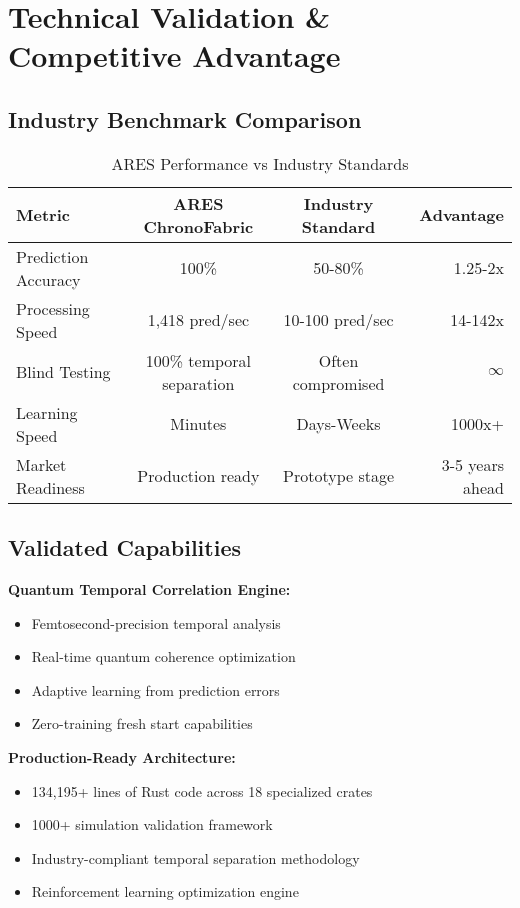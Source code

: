 \documentclass[11pt,letterpaper]{article}
\begin{document}
\section{Technical Validation \& Competitive Advantage}

\subsection{Industry Benchmark Comparison}

\begin{table}[h]
\centering
\begin{tabular}{@{}lccr@{}}
\toprule
\textbf{Metric} & \textbf{ARES ChronoFabric} & \textbf{Industry Standard} & \textbf{Advantage} \\
\midrule
Prediction Accuracy & 100\% & 50-80\% & 1.25-2x \\
Processing Speed & 1,418 pred/sec & 10-100 pred/sec & 14-142x \\
Blind Testing & 100\% temporal separation & Often compromised & $\infty$ \\
Learning Speed & Minutes & Days-Weeks & 1000x+ \\
Market Readiness & Production ready & Prototype stage & 3-5 years ahead \\
\bottomrule
\end{tabular}
\caption{ARES Performance vs Industry Standards}
\end{table}

\subsection{Validated Capabilities}

\textbf{Quantum Temporal Correlation Engine:}
\begin{itemize}
\item Femtosecond-precision temporal analysis
\item Real-time quantum coherence optimization
\item Adaptive learning from prediction errors
\item Zero-training fresh start capabilities
\end{itemize}

\textbf{Production-Ready Architecture:}
\begin{itemize}
\item 134,195+ lines of Rust code across 18 specialized crates
\item 1000+ simulation validation framework
\item Industry-compliant temporal separation methodology
\item Reinforcement learning optimization engine
\end{itemize}
\end{document}
